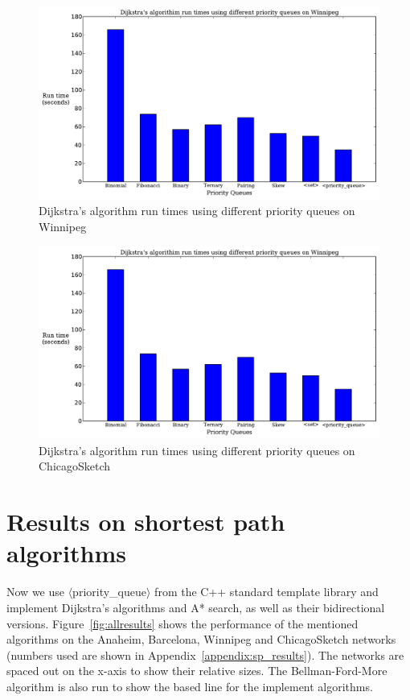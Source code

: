 \begin{figure}[H]
    \centering
    \includegraphics[page=1, width=\textwidth, height=.4\textheight]{img/pq_runtime}
    \caption{Dijkstra's algorithm run times using different priority queues on Winnipeg}
    \label{fig:pq_runtime2}
\end{figure}
\begin{figure}[H]
    \centering
    \includegraphics[page=2, width=\textwidth, height=.4\textheight]{img/pq_runtime}
    \caption{Dijkstra's algorithm run times using different priority queues on ChicagoSketch}
    \label{fig:pq_runtime}
\end{figure}

\section{Results on shortest path algorithms}
Now we use $\langle$priority\_queue$\rangle$ from the C++ standard template library and implement Dijkstra's algorithms and A* search, as well as their bidirectional versions.
Figure~\ref{fig:allresults} shows the performance of the mentioned algorithms on the Anaheim, Barcelona, Winnipeg and ChicagoSketch networks
(numbers used are shown in Appendix~\ref{appendix:sp_results}).
The networks are spaced out on the x-axis to show their relative sizes.
The Bellman-Ford-More algorithm is also run to show the based line for the implement algorithms.

